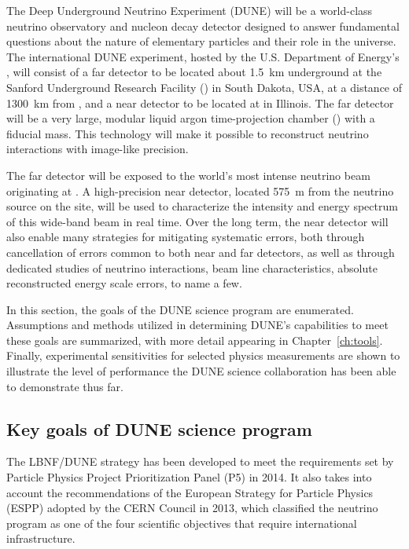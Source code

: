 The Deep Underground Neutrino Experiment (DUNE) will be a
world-class neutrino observatory and nucleon decay detector
designed to answer
fundamental questions about the nature of elementary particles
and their role in the universe. The international DUNE
experiment, hosted by the U.S. Department of Energy's \fnal{},
will consist of a far detector to be located about \SI{1.5}{km}
underground at the Sanford Underground Research Facility
(\surf) in South Dakota, USA, at a distance of  \SI{1300}{\km}
from \fnal{}, and a near detector to be located at \fnal in
Illinois. The far detector will be a very large, modular
liquid argon time-projection chamber (\lartpc) with a
\fdfiducialmass fiducial mass. This \lar technology will make
it possible to reconstruct neutrino interactions
with image-like precision.

The far detector will be exposed to the world's most intense 
neutrino beam originating at \fnal{}. A high-precision near 
detector, located \SI{575}{m} from the neutrino source on 
the \fnal site, will be used to characterize
the intensity and energy spectrum of this wide-band 
beam in real time.  Over the long term, the near detector 
will also enable many strategies for mitigating systematic 
errors, both through cancellation of errors common to both near and far detectors, as well as through dedicated studies
of neutrino interactions, beam line characteristics, 
absolute reconstructed energy scale errors, to name a few.

In this section, the goals of the DUNE science program are
enumerated.  Assumptions and methods utilized in determining
DUNE's capabilities to meet these goals are summarized,
with more detail appearing in Chapter~\ref{ch:tools}.
Finally, experimental sensitivities for selected
physics measurements are shown to illustrate the level of 
performance the DUNE science collaboration has been able 
to demonstrate thus far.

\subsection{Key goals of DUNE science program}
\label{sec:exec-key-goals}

The LBNF/DUNE strategy has been developed to meet the
requirements set by Particle Physics Project Prioritization Panel
(P5) in 2014. It also takes into account the recommendations
of the European Strategy for Particle Physics (ESPP) adopted
by the CERN Council in 2013, which classified the 
neutrino program as one of the four scientific objectives that
require international infrastructure.

